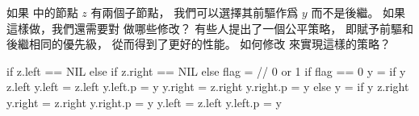 \startEXERCISE
如果  中的節點 $z$ 有兩個子節點，
我們可以選擇其前驅作爲 $y$ 而不是後繼。
如果這樣做，我們還需要對  做哪些修改？
有些人提出了一個公平策略，
即賦予前驅和後繼相同的優先級，
從而得到了更好的性能。
如何修改  來實現這樣的策略？
\stopEXERCISE

\startANSWER
{}
\startCLRSCODE
if z.left == NIL
else if z.right == NIL
else
	flag = 		// 0 or 1
	if flag == 0
		y = 
		if y \ne z.left
			y.left = z.left
			y.left.p = y
		y.right = z.right
		y.right.p = y
	else
		y = 
		if y \ne z.right
			y.right = z.right
			y.right.p = y
		y.left = z.left
		y.left.p = y
\stopCLRSCODE
\stopANSWER
